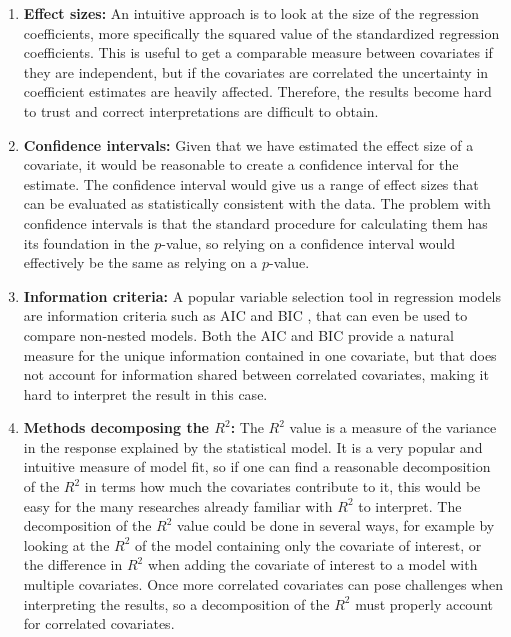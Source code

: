 \begin{enumerate}[i]
    \item \textbf{Effect sizes:} An intuitive approach is to look at the size of the regression coefficients, more specifically the squared value of the standardized regression coefficients. This is useful to get a comparable measure between covariates if they are independent, but if the covariates are correlated the uncertainty in coefficient estimates are heavily affected. 
    Therefore, the results become hard to trust and correct interpretations are difficult to obtain. %
    \item \textbf{Confidence intervals:} Given that we have estimated the effect size of a covariate, it would be reasonable to create a confidence interval for the estimate. The confidence interval would give us a range of effect sizes that can be evaluated as statistically consistent with the data. 
    The problem with confidence intervals is that the standard procedure for calculating them has its foundation in the $p$-value, so relying on a confidence interval would effectively be the same as relying on a $p$-value.
    \item \textbf{Information criteria:} A popular variable selection tool in regression models are information criteria such as AIC \citep{Akaike_AIC} and BIC \citep{Schwarz_BIC}, that can even be used to compare non-nested models. 
    Both the AIC and BIC provide a natural measure for the unique information contained in one covariate, but that does not account for information shared between correlated covariates, making it hard to interpret the result in this case.
    \item \textbf{Methods decomposing the $R^2$:} The $R^2$ value is a measure of the variance in the response explained by the statistical model. It is a very popular and intuitive measure of model fit, so if one can find a reasonable decomposition of the $R^2$ in terms how much the covariates contribute to it, this would be easy for the many researches already familiar with $R^2$ to interpret.
    The decomposition of the $R^2$ value could be done in several ways, for example by looking at the $R^2$ of the model containing only the covariate of interest, or the difference in $R^2$ when adding the covariate of interest to a model with multiple covariates. Once more correlated covariates can pose challenges when interpreting the results, so a decomposition of the $R^2$ must properly account for correlated covariates.
\end{enumerate}

